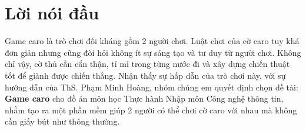 \section*{Lời nói đầu}
Game caro là trò chơi đối kháng gồm 2 người chơi. Luật chơi của cờ caro tuy khá đơn giản nhưng cũng đòi hỏi không ít sự sáng tạo và tư duy từ người chơi. Không chỉ vậy, cờ thủ cần cẩn thận, tỉ mỉ trong từng nước đi và xây dựng chiến thuật tốt để giành được chiến thắng. Nhận thấy sự hấp dẫn của trò chơi này, với sự hướng dẫn của ThS. Phạm Minh Hoàng, nhóm chúng em quyết định chọn đề tài: \textbf{Game caro} cho đồ án môn học Thực hành Nhập môn Công nghệ thông tin, nhằm tạo ra một phần mềm giúp 2 người có thể chơi cờ caro với nhau mà không cần giấy bút như thông thường. %


